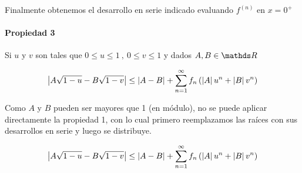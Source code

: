 Finalmente obtenemos el desarrollo en serie indicado evaluando $f^{(n)}$ en $x=0^+$


\paragraph{Propiedad 3} Si $u$ y $v$ son tales que $0 \leq u \leq 1 \ , \ 0 \leq v \leq 1$ y dados $A,B \in \reals$ 

\begin{equation}
    \left|A \sqrt{1-u} - B \sqrt{1-v} \right| \leq \left|A-B\right| + \sum_{n=1}^{\infty} f_n \left(\left|A\right| u^n + \left|B\right| v^n\right)
    \label{eqn:desigtriangconproductoria2}
\end{equation}

Como $A$ y $B$ pueden ser mayores que 1 (en módulo), no se puede aplicar directamente la propiedad 1, con lo cual primero reemplazamos las raíces con sus desarrollos en serie y luego se distribuye.

\begin{equation}
    \left|A \sqrt{1-u} - B \sqrt{1-v} \right| \leq \left|A-B\right| + \sum_{n=1}^{\infty} f_n \left(\left|A\right| u^n + \left|B\right| v^n\right)
    \label{eqn:desigtriangconproductoria3}
\end{equation}
